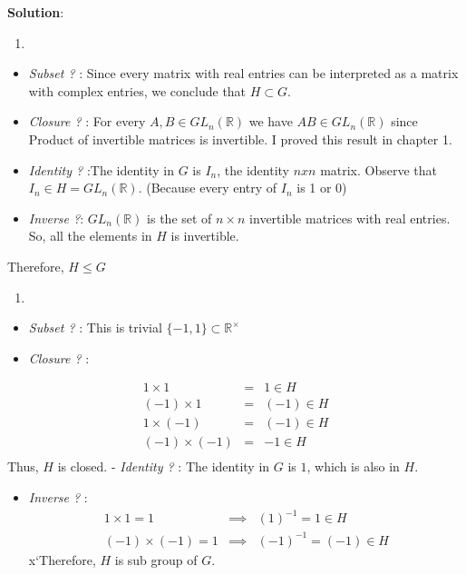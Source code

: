 \documentclass[
]{book}
\providecommand{\tightlist}{%
  \setlength{\itemsep}{0pt}\setlength{\parskip}{0pt}}
\theoremstyle{definition}
\theoremstyle{definition}
\theoremstyle{definition}
\theoremstyle{definition}
\theoremstyle{remark}
\begin{document}
\textbf{Solution}:\\

\begin{enumerate}
\def\labelenumi{(\alph{enumi})}
\tightlist
\item
\end{enumerate}

\begin{itemize}
\item
  \emph{Subset ?} : Since every matrix with real entries can be interpreted as a matrix with complex entries, we conclude that \(H \subset G\).
\item
  \emph{Closure ?} : For every \(A, B \in GL_n(\mathbb{R})\) we have \(AB \in GL_n(\mathbb{R})\) since Product of invertible matrices is invertible. I proved this result in chapter 1.
\item
  \emph{Identity ?} :The identity in \(G\) is \(I_n\), the identity \(n x n\) matrix. Observe that \(I_n\in H=GL_n(\mathbb{R})\). (Because every entry of \(I_n\) is 1 or 0)
\item
  \emph{Inverse ?}: \(GL_n(\mathbb{R})\) is the set of \(n \times n\) invertible matrices with real entries. So, all the elements in \(H\) is invertible.
\end{itemize}

Therefore, \(H \leq G\)

\begin{enumerate}
\def\labelenumi{(\alph{enumi})}
\setcounter{enumi}{1}
\tightlist
\item
\end{enumerate}

\begin{itemize}
\item
  \emph{Subset ?} : This is trivial \(\{-1,1\}\subset \mathbb{R}^\times\)
\item
  \emph{Closure ?} :
\end{itemize}

\begin{eqnarray}
1 \times 1 &=& 1\in H\\
(-1) \times 1 &=& (-1)\in H\\
1 \times (-1) &=& (-1)\in H\\
(-1) \times (-1) &=& -1\in H\\
\end{eqnarray}
Thus, \(H\) is closed.
- \emph{Identity ?} : The identity in \(G\) is \(1\), which is also in \(H\).

\begin{itemize}
\tightlist
\item
  \emph{Inverse ?} :
  \begin{eqnarray}
  1 \times 1 = 1   &\implies & (1)^{-1}=1\in H\\
  (-1) \times (-1) = 1 &\implies & (-1)^{-1}=(-1)\in H
  \end{eqnarray}
  x`Therefore, \(H\) is sub group of \(G\).
\end{itemize}
\end{document}
